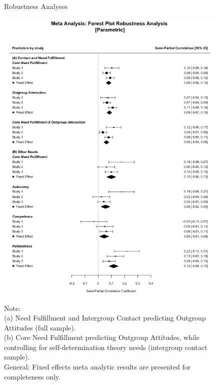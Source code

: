 \documentclass[man, 12pt, a4paper, mask]{apa7}
\theoremstyle{break}
\theoremstyle{plain}
\begin{document}
\begin{figure}
  \caption{Robustness Analyses}
  \label{fig:Robustness}
  \centering\includegraphics[width=\textwidth]{Figures/forestParametricRobustnessComb.png}
  \caption*{Note: \\
  (a) Need Fulfillment and Intergroup Contact predicting Outgroup Attitudes (full sample).\\
  (b) Core Need Fulfillment predicting Outgroup Attitudes, while controlling for self-determination theory needs (intergroup contact sample).\\
  General: Fixed effects meta analytic results are presented for completeness only.}
\end{figure}
\end{document}
